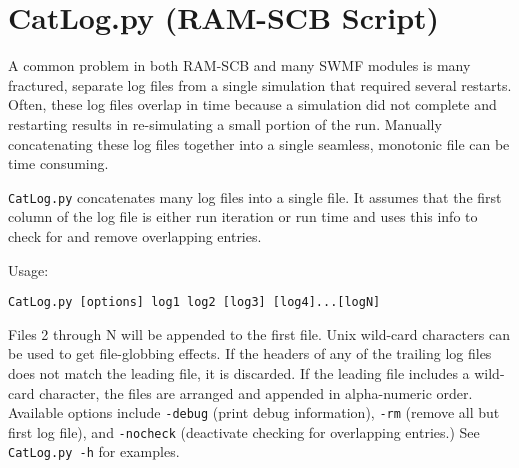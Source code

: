
\section{CatLog.py (RAM-SCB Script)}
A common problem in both RAM-SCB and many SWMF modules is many fractured, 
separate log files from a single simulation that required several restarts.
Often, these log files overlap in time because a simulation did not complete
and restarting results in re-simulating a small portion of the run.  
Manually concatenating these log files together into a single seamless, 
monotonic file can be time consuming.

{\tt CatLog.py} concatenates many log files into a single file.  It assumes that
the first column of the log file is either run iteration or run time and uses
this info to check for and remove overlapping entries.

Usage:
\begin{verbatim}
CatLog.py [options] log1 log2 [log3] [log4]...[logN]
\end{verbatim}

Files 2 through N will be appended to the first file.  Unix wild-card 
characters can be used to get file-globbing effects.  If the headers of any
of the trailing log files does not match the leading file, it is discarded.
If the leading file includes a wild-card character, the files are arranged and
appended in alpha-numeric order.  Available options include {\tt -debug}
(print debug information), {\tt -rm} (remove all but first log file), and
{\tt -nocheck} (deactivate checking for overlapping entries.)  See 
{\tt CatLog.py -h} for examples.

